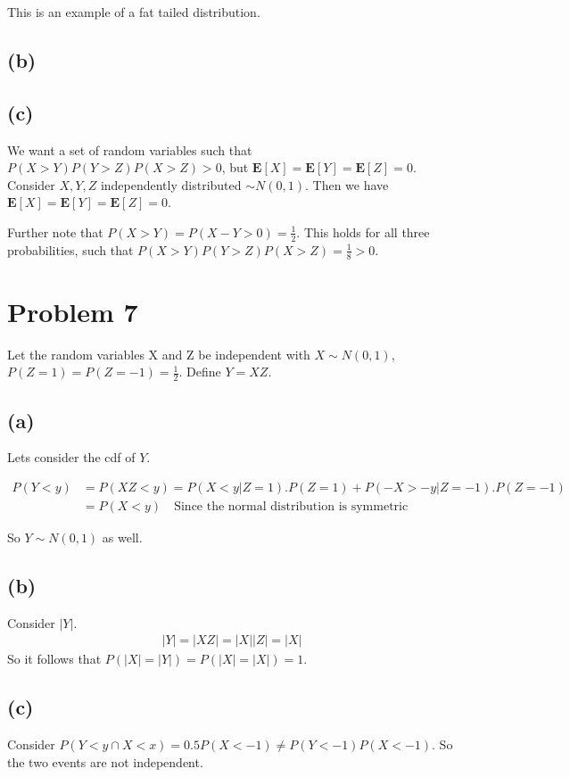 \documentclass{article}
\begin{document}
	This is an example of a fat tailed distribution.
	
	\subsection*{(b)}
	
	
	\subsection*{(c)}
	We want a set of random variables such that $P(X > Y)P(Y > Z)P(X > Z) > 0$, but $\mathbf{E}[X] = \mathbf{E}[Y] = \mathbf{E}[Z] = 0$. Consider $X,Y,Z$ independently distributed $\sim N(0,1)$. Then we have $\mathbf{E}[X] = \mathbf{E}[Y] = \mathbf{E}[Z] = 0$. 
	
	Further note that $P(X > Y) = P(X - Y > 0) = \frac{1}{2}$. This holds for all three probabilities, such that $P(X > Y)P(Y > Z)P(X > Z) = \frac{1}{8} > 0$. 
	
	\section*{Problem 7}
	Let the random variables X and Z be independent with $X \sim N(0,1)$, $P(Z=1) = P(Z=-1) = \frac{1}{2}$. Define $Y = XZ$. 
	
	\subsection*{(a)}
	Lets consider the cdf of $Y$. 
	
	\begin{align*}
	P(Y < y) &= P(XZ < y) = P(X < y | Z = 1).P(Z=1) + P(- X > - y | Z = -1).P(Z = -1) \\
	&= P(X < y) \quad \text{Since the normal distribution is symmetric}
	\end{align*}
	
	So $Y \sim N(0,1)$ as well.
	
	\subsection*{(b)}
	Consider $|Y|$.
	\begin{align*}
	|Y| = |XZ| = |X||Z|= |X|
	\end{align*}
	So it follows that $P(|X| = |Y|) = P(|X| = |X|) = 1$.
	
	\subsection*{(c)}
	Consider $P(Y < y \cap X < x) = 0.5 P(X < -1) \neq P(Y < -1) P(X < -1)$. So the two events are not independent.
	
\end{document}
